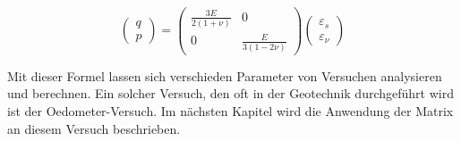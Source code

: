 \[
\begin{pmatrix}
	q\\
	p
\end{pmatrix}
=
\begin{pmatrix}
	\frac{3E}{2(1+\nu)} & 0 \\
	0 & \frac{E}{3(1-2\nu)}
\end{pmatrix}
\begin{pmatrix}
	\varepsilon_{s}\\
	\varepsilon_{\nu}
\end{pmatrix}
\]

Mit dieser Formel lassen sich verschieden Parameter von Versuchen analysieren und berechnen.
Ein solcher Versuch, den oft in der Geotechnik durchgeführt wird ist der Oedometer-Versuch.
Im nächsten Kapitel wird die Anwendung der Matrix an diesem Versuch beschrieben.
